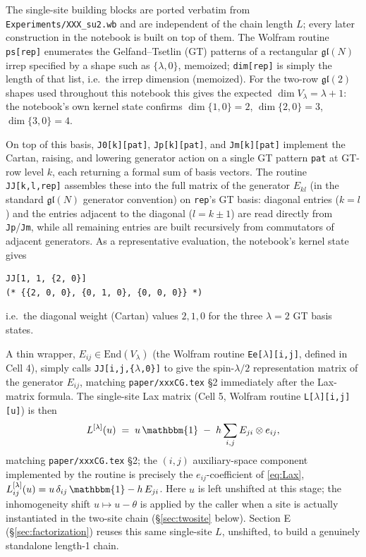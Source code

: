 \documentclass[11pt]{article}
\begin{document}
The single-site building blocks are ported verbatim from \texttt{Experiments/XXX\_su2.wb} and are
independent of the chain length $L$; every later construction in the notebook is built on top of
them. The Wolfram routine \texttt{ps[rep]} enumerates the Gelfand--Tsetlin (GT) patterns of a
rectangular $\mathfrak{gl}(N)$ irrep specified by a shape such as $\{\lambda,0\}$, memoized;
\texttt{dim[rep]} is simply the length of that list, i.e.\ the irrep dimension (memoized). For the
two-row $\mathfrak{gl}(2)$ shapes used throughout this notebook this gives the expected
$\dim V_\lambda = \lambda+1$: the notebook's own kernel state confirms $\dim\{1,0\}=2$,
$\dim\{2,0\}=3$, $\dim\{3,0\}=4$.

On top of this basis, \texttt{J0[k][pat]}, \texttt{Jp[k][pat]}, and \texttt{Jm[k][pat]} implement
the Cartan, raising, and lowering generator action on a single GT pattern \texttt{pat} at GT-row
level $k$, each returning a formal sum of basis vectors. The routine \texttt{JJ[k,l,rep]} assembles
these into the full matrix of the generator $E_{kl}$ (in the standard $\mathfrak{gl}(N)$ generator
convention) on \texttt{rep}'s GT basis: diagonal entries ($k=l$) and the entries adjacent to the
diagonal ($l=k\pm1$) are read directly from \texttt{Jp}/\texttt{Jm}, while all remaining entries are
built recursively from commutators of adjacent generators. As a representative evaluation, the
notebook's kernel state gives
\begin{verbatim}
JJ[1, 1, {2, 0}]
(* {{2, 0, 0}, {0, 1, 0}, {0, 0, 0}} *)
\end{verbatim}
i.e.\ the diagonal weight (Cartan) values $2,1,0$ for the three $\lambda=2$ GT basis states.

A thin wrapper, $E_{ij}\in\mathrm{End}(V_\lambda)$ (the Wolfram routine \texttt{Ee[$\lambda$][i,j]},
defined in Cell 4), simply calls \texttt{JJ[i,j,\{$\lambda$,0\}]} to give the spin-$\lambda/2$
representation matrix of the generator $E_{ij}$, matching \texttt{paper/xxxCG.tex} \S2 immediately
after the Lax-matrix formula. The single-site Lax matrix (Cell 5, Wolfram routine
\texttt{L[$\lambda$][i,j][u]}) is then
\begin{equation}
  L^{[\lambda]}(u) \;=\; u\,\mathbbm{1} \;-\; h \sum_{i,j} E_{ji}\otimes e_{ij},
  \label{eq:Lax}
\end{equation}
matching \texttt{paper/xxxCG.tex} \S2; the $(i,j)$ auxiliary-space component implemented by the
routine is precisely the $e_{ij}$-coefficient of \eqref{eq:Lax},
$L^{[\lambda]}_{ij}(u) = u\,\delta_{ij}\,\mathbbm{1} - h\,E_{ji}$.
Here $u$ is left unshifted at this stage; the inhomogeneity shift $u\mapsto u-\theta$ is applied by
the caller when a site is actually instantiated in the two-site chain (\S\ref{sec:twosite} below).
Section E (\S\ref{sec:factorization}) reuses this same single-site $L$, unshifted, to build a
genuinely standalone length-1 chain.
\end{document}
